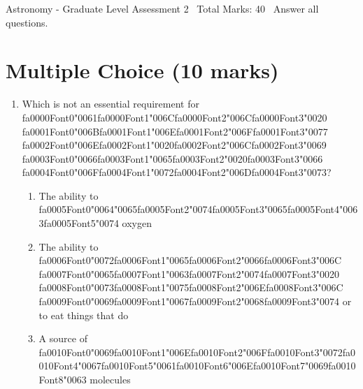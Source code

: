 \documentclass[12pt]{article}
\begin{document}
\begin{center}
Astronomy - Graduate Level Assessment 2 \
Total Marks: 40 \
Answer all questions.
\end{center}

\section*{Multiple Choice (10 marks)}
\begin{enumerate}[label=\arabic*.]
\item Which is not an essential requirement for {\csname fa0000Font0\endcsname\char"0061}{\csname fa0000Font1\endcsname\char"006C}{\csname fa0000Font2\endcsname\char"006C}{\csname fa0000Font3\endcsname\char"0020} {\csname fa0001Font0\endcsname\char"006B}{\csname fa0001Font1\endcsname\char"006E}{\csname fa0001Font2\endcsname\char"006F}{\csname fa0001Font3\endcsname\char"0077} {\csname fa0002Font0\endcsname\char"006E}{\csname fa0002Font1\endcsname\char"0020}{\csname fa0002Font2\endcsname\char"006C}{\csname fa0002Font3\endcsname\char"0069} {\csname fa0003Font0\endcsname\char"0066}{\csname fa0003Font1\endcsname\char"0065}{\csname fa0003Font2\endcsname\char"0020}{\csname fa0003Font3\endcsname\char"0066} {\csname fa0004Font0\endcsname\char"006F}{\csname fa0004Font1\endcsname\char"0072}{\csname fa0004Font2\endcsname\char"006D}{\csname fa0004Font3\endcsname\char"0073}?
\begin{enumerate}[label=(\alph*)]
    \item The ability to {\csname fa0005Font0\endcsname\char"0064}{\char"0065}{\csname fa0005Font2\endcsname\char"0074}{\csname fa0005Font3\endcsname\char"0065}{\csname fa0005Font4\endcsname\char"0063}{\csname fa0005Font5\endcsname\char"0074} oxygen
    \item The ability to {\csname fa0006Font0\endcsname\char"0072}{\csname fa0006Font1\endcsname\char"0065}{\csname fa0006Font2\endcsname\char"0066}{\csname fa0006Font3\endcsname\char"006C} {\csname fa0007Font0\endcsname\char"0065}{\csname fa0007Font1\endcsname\char"0063}{\csname fa0007Font2\endcsname\char"0074}{\csname fa0007Font3\endcsname\char"0020} {\csname fa0008Font0\endcsname\char"0073}{\csname fa0008Font1\endcsname\char"0075}{\csname fa0008Font2\endcsname\char"006E}{\csname fa0008Font3\endcsname\char"006C} {\csname fa0009Font0\endcsname\char"0069}{\csname fa0009Font1\endcsname\char"0067}{\csname fa0009Font2\endcsname\char"0068}{\csname fa0009Font3\endcsname\char"0074} or to eat things that do
    \item A source of {\csname fa0010Font0\endcsname\char"0069}{\csname fa0010Font1\endcsname\char"006E}{\csname fa0010Font2\endcsname\char"006F}{\csname fa0010Font3\endcsname\char"0072}{\csname fa0010Font4\endcsname\char"0067}{\csname fa0010Font5\endcsname\char"0061}{\csname fa0010Font6\endcsname\char"006E}{\csname fa0010Font7\endcsname\char"0069}{\csname fa0010Font8\endcsname\char"0063} molecules

\end{enumerate}
\end{enumerate}
\end{document}
